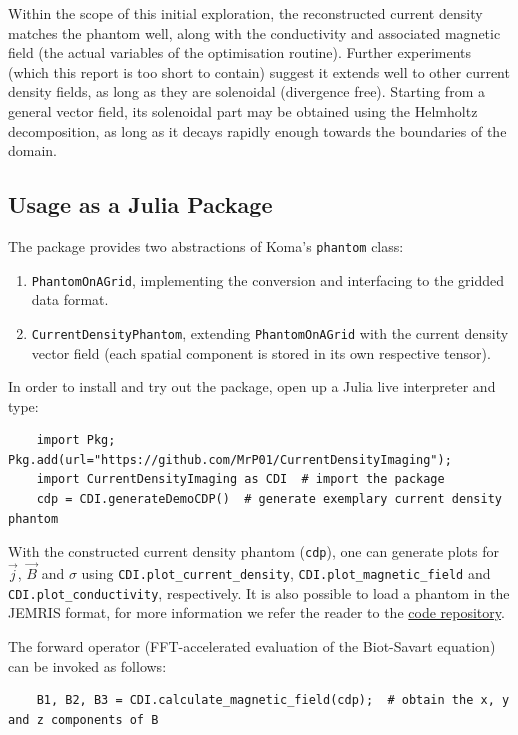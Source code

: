 \documentclass[10pt]{article}
\begin{document}
  Within the scope of this initial exploration, the reconstructed current density matches the phantom well, along with the conductivity and associated magnetic field (the actual variables of the optimisation routine).
  Further experiments (which this report is too short to contain) suggest it extends well to other current density fields, as long as they are solenoidal (divergence free).
  Starting from a general vector field, its solenoidal part may be obtained using the Helmholtz decomposition, as long as it decays rapidly enough towards the boundaries of the domain.

  \subsection{Usage as a Julia Package}
  The package provides two abstractions of Koma's \texttt{phantom} class:
  \begin{enumerate}
    \item \texttt{PhantomOnAGrid}, implementing the conversion and interfacing to the gridded data format.
    \item \texttt{CurrentDensityPhantom}, extending \texttt{PhantomOnAGrid} with the current density vector field (each spatial component is stored in its own respective tensor).
  \end{enumerate}

  In order to install and try out the package, open up a Julia live interpreter and type:
  \begin{verbatim}
    import Pkg; Pkg.add(url="https://github.com/MrP01/CurrentDensityImaging");
    import CurrentDensityImaging as CDI  # import the package
    cdp = CDI.generateDemoCDP()  # generate exemplary current density phantom
  \end{verbatim}

  With the constructed current density phantom (\texttt{cdp}), one can generate plots for $\vec{j}$, $\vec{B}$ and $\sigma$ using
  \texttt{CDI.plot\_current\_density},
  \texttt{CDI.plot\_magnetic\_field} and
  \texttt{CDI.plot\_conductivity}, respectively.
  It is also possible to load a phantom in the JEMRIS format, for more information we refer the reader to the \href{https://github.com/MrP01/CurrentDensityImaging}{code repository}.

  The forward operator (FFT-accelerated evaluation of the Biot-Savart equation) can be invoked as follows:
  \begin{verbatim}
    B1, B2, B3 = CDI.calculate_magnetic_field(cdp);  # obtain the x, y and z components of B
  \end{verbatim}
\end{document}
